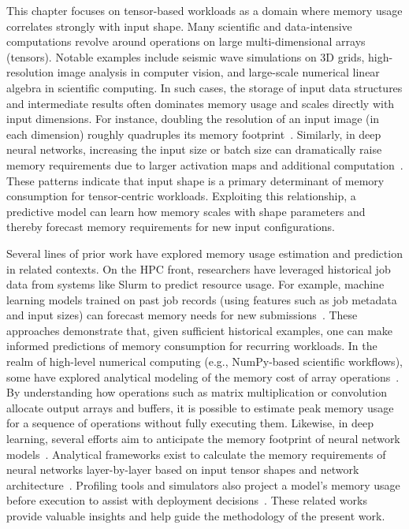 This chapter focuses on tensor-based workloads as a domain where memory usage correlates strongly with input shape.
Many scientific and data-intensive computations revolve around operations on large multi-dimensional arrays (tensors).
Notable examples include seismic wave simulations on \ac{3D} grids, high-resolution image analysis in computer vision, and large-scale numerical linear algebra in scientific computing.
In such cases, the storage of input data structures and intermediate results often dominates memory usage and scales directly with input dimensions.
For instance, doubling the resolution of an input image (in each dimension) roughly quadruples its memory footprint~\cite{stackoverflow_memory_inv}.
Similarly, in deep neural networks, increasing the input size or batch size can dramatically raise memory requirements due to larger activation maps and additional computation~\cite{dell_3dunet_memory}.
These patterns indicate that input shape is a primary determinant of memory consumption for tensor-centric workloads.
Exploiting this relationship, a predictive model can learn how memory scales with shape parameters and thereby forecast memory requirements for new input configurations.

Several lines of prior work have explored memory usage estimation and prediction in related contexts.
On the \ac{HPC} front, researchers have leveraged historical job data from systems like Slurm to predict resource usage.
For example, machine learning models trained on past job records (using features such as job metadata and input sizes) can forecast memory needs for new submissions~\cite{yoo2003slurm}.
These approaches demonstrate that, given sufficient historical examples, one can make informed predictions of memory consumption for recurring workloads.
In the realm of high-level numerical computing (e.g., NumPy-based scientific workflows), some have explored analytical modeling of the memory cost of array operations~\cite{cornell_memory_workshop}.
By understanding how operations such as matrix multiplication or convolution allocate output arrays and buffers, it is possible to estimate peak memory usage for a sequence of operations without fully executing them.
Likewise, in deep learning, several efforts aim to anticipate the memory footprint of neural network models~\cite{gao2020}.
Analytical frameworks exist to calculate the memory requirements of neural networks layer-by-layer based on input tensor shapes and network architecture~\cite{dell_3dunet_memory}.
Profiling tools and simulators also project a model’s memory usage before execution to assist with deployment decisions~\cite{tanash2019}.
These related works provide valuable insights and help guide the methodology of the present work.

